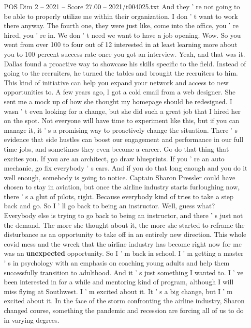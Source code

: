 \begin{textsample}{POS Dim 2 – 2021 – Score 27.00 – 2021/t004025.txt}
And they ' re not going to be able to properly utilize me within their organization.
I don ' t want to work there anyway.
The fourth one, they were just like, come into the office, you ' re hired, you ' re in.
We don ' t need we want to have a job opening.
Wow.
So you went from over 100 to four out of 12 interested in at least learning more about you to 100 percent success rate once you got an interview.
Yeah, and that was it.
Dallas found a proactive way to showcase his skills specific to the field.
Instead of going to the recruiters, he turned the tables and brought the recruiters to him.
This kind of initiative can help you expand your network and access to new opportunities to.
A few years ago, I got a cold email from a web designer.
She sent me a mock up of how she thought my homepage should be redesigned.
I wasn ' t even looking for a change, but she did such a great job that I hired her on the spot.
Not everyone will have time to experiment like this, but if you can manage it, it ' s a promising way to proactively change the situation.
There ' s evidence that side hustles can boost our engagement and performance in our full time jobs, and sometimes they even become a career.
Go do that thing that excites you.
If you are an architect, go draw blueprints.
If you ' re an auto mechanic, go fix everybody ' s cars.
And if you do that long enough and you do it well enough, somebody is going to notice.
Captain Sharon Pressler could have chosen to stay in aviation, but once the airline industry starts furloughing now, there ' s a glut of pilots, right.
Because everybody kind of tries to take a step back and go.
So I ' ll go back to being an instructor.
Well, guess what?
Everybody else is trying to go back to being an instructor, and there ' s just not the demand.
The more she thought about it, the more she started to reframe the disturbance as an opportunity to take off in an entirely new direction.
This whole covid mess and the wreck that the airline industry has become right now for me was an \textbf{unexpected} opportunity.
So I ' m back in school.
I ' m getting a master ' s in psychology with an emphasis on coaching young adults and help them successfully transition to adulthood.
And it ' s just something I wanted to.
I ' ve been interested in for a while and mentoring kind of program, although I will miss flying at Southwest.
I ' m excited about it.
It ' s a big change, but I ' m excited about it.
In the face of the storm confronting the airline industry, Sharon changed course, something the pandemic and recession are forcing all of us to do in varying degrees.

\end{textsample}

